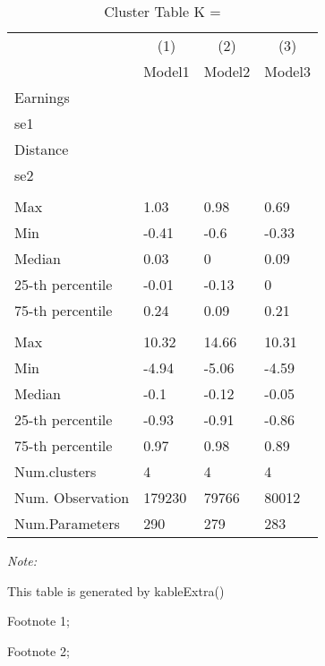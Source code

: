 \begin{table}
\centering
\caption{Cluster Table K = }
\centering
\begin{threeparttable}
\begin{tabular}[t]{llll}
\toprule
\multicolumn{1}{c}{ } & \multicolumn{1}{c}{(1)} & \multicolumn{1}{c}{(2)} & \multicolumn{1}{c}{(3)} \\
\cmidrule(l{3pt}r{3pt}){2-2} \cmidrule(l{3pt}r{3pt}){3-3} \cmidrule(l{3pt}r{3pt}){4-4}
 & Model1 & Model2 & Model3\\
\midrule
Earnings &  &  & \\
se1 &  &  & \\
Distance &  &  & \\
se2 &  &  & \\
\addlinespace[0.3em]
\multicolumn{4}{l}{\textit{\textbf{Panel A: }}}\\
\hspace{1em}Max & 1.03 & 0.98 & 0.69\\
\hspace{1em}Min & -0.41 & -0.6 & -0.33\\
\hspace{1em}Median & 0.03 & 0 & 0.09\\
\hspace{1em}25-th percentile & -0.01 & -0.13 & 0\\
\hspace{1em}75-th percentile & 0.24 & 0.09 & 0.21\\
\addlinespace[0.3em]
\multicolumn{4}{l}{\textit{\textbf{Panel B: }}}\\
\hspace{1em}Max & 10.32 & 14.66 & 10.31\\
\hspace{1em}Min & -4.94 & -5.06 & -4.59\\
\hspace{1em}Median & -0.1 & -0.12 & -0.05\\
\hspace{1em}25-th percentile & -0.93 & -0.91 & -0.86\\
\hspace{1em}75-th percentile & 0.97 & 0.98 & 0.89\\
Num.clusters & 4 & 4 & 4\\
Num. Observation & 179230 & 79766 & 80012\\
Num.Parameters & 290 & 279 & 283\\
\bottomrule
\end{tabular}
\begin{tablenotes}
\item \textit{Note: } 
\item This table is generated by kableExtra()
\item[1] Footnote 1; 
\item[2] Footnote 2; 
\end{tablenotes}
\end{threeparttable}
\end{table}
